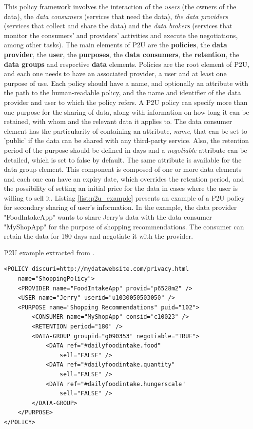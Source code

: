 This policy framework involves the interaction of the \textit{users} (the owners of the data), the \textit{data consumers} (services that need the data), \textit{the data providers} (services that collect and share the data) and the \textit{data brokers} (services that monitor the consumers' and providers' activities and execute the negotiations, among other tasks).
The main elements of P2U are the \textbf{policies}, the \textbf{data provider}, the \textbf{user}, the \textbf{purposes}, the \textbf{data consumers}, the \textbf{retention}, the \textbf{data groups} and respective \textbf{data} elements.
Policies are the root element of P2U, and each one needs to have an associated provider, a user and at least one purpose of use.
Each policy should have a name, and optionally an attribute with the path to the human-readable policy, and the name and identifier of the data provider and user to which the policy refers.
A P2U policy can specify more than one purpose for the sharing of data, along with information on how long it can be retained, with whom and the relevant data it applies to.
The data consumer element has the particularity of containing an attribute, \textit{name}, that can be set to 'public' if the data can be shared with any third-party service.
Also, the retention period of the purpose should be defined in days and a \textit{negotiable} attribute can be detailed, which is set to false by default.
The same attribute is available for the data group element.
This component is composed of one or more data elements and each one can have an expiry date, which overrides the retention period, and the possibility of setting an initial price for the data in cases where the user is willing to sell it.
Listing \ref{list:p2u_example} presents an example of a P2U policy for secondary sharing of user's information. In the example, the data provider "FoodIntakeApp" wants to share Jerry's data with the data consumer "MyShopApp" for the purpose of shopping recommendations. The consumer can retain the data for 180 days and negotiate it with the provider.

\begin{listing}
\caption{P2U example extracted from \cite{iyilade_p2u_2014}.}
\label{list:p2u_example}
\begin{verbatim}
<POLICY discuri=http://mydatawebsite.com/privacy.html 
    name="ShoppingPolicy">
    <PROVIDER name="FoodIntakeApp" provid="p6528m2" />
    <USER name="Jerry" userid="u1030050503050" />
    <PURPOSE name="Shopping Recommendations" puid="102">
        <CONSUMER name="MyShopApp" consid="c10023" />
        <RETENTION period="180" />
        <DATA-GROUP groupid="g090353" negotiable="TRUE">
            <DATA ref="#dailyfoodintake.food" 
                sell="FALSE" />
            <DATA ref="#dailyfoodintake.quantity" 
                sell="FALSE" />
            <DATA ref="#dailyfoodintake.hungerscale" 
                sell="FALSE" />
        </DATA-GROUP>
    </PURPOSE>
</POLICY>
\end{verbatim}
\end{listing}

